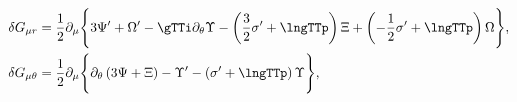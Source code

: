 \begin{equation}
\begin{aligned}
\delta G_{\mu r} & = \frac{1}{2} \partial_\mu \Bigg\{3 \Psi' + \Omega'
- \gTTi \partial_\theta \Upsilon - \left(\frac{3}{2} \sigma' +
\lngTTp \right) \Xi + \left(-\frac{1}{2} \sigma' + \lngTTp \right)
\Omega \Bigg\},\\
\delta G_{\mu \theta} & = \frac{1}{2} \partial_\mu
\Bigg\{\partial_\theta\left(3 \Psi + \Xi \right) - \Upsilon' -
\left(\sigma' + \lngTTp \right) \Upsilon \Bigg\},
\end{aligned}
\end{equation}

